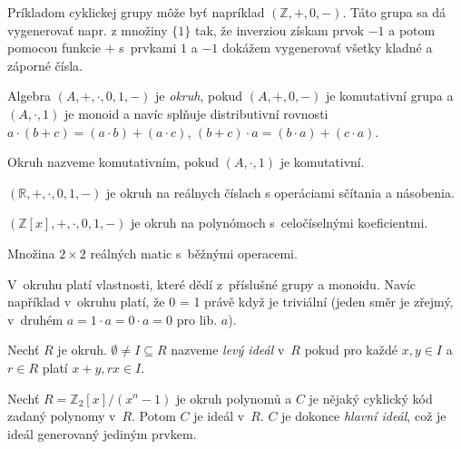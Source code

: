 \begin{example}
	Príkladom cyklickej grupy môže byť napríklad $(\mathbb{Z}, +, 0, -)$.
	Táto grupa sa dá vygenerovať napr. z množiny $\{1\}$ tak, že
	inverziou získam prvok $-1$ a potom pomocou funkcie $+$
	s~prvkami $1$ a $-1$ dokážem vygenerovať všetky kladné
	a záporné čísla.
\end{example}


\begin{definition}[Okruh]
    Algebra $(A, +, \cdot, 0, 1, -)$ je {\em okruh}, pokud
    $(A, +, 0, -)$ je komutativní grupa
    a $(A, \cdot, 1)$ je monoid
    a navíc splňuje distributivní rovnosti
    $a \cdot (b + c) = (a \cdot b) + (a \cdot c)$,
    $(b + c) \cdot a = (b \cdot a) + (c \cdot a)$.

    Okruh nazveme komutativním, pokud $(A, \cdot, 1)$ je komutativní.
\end{definition}

\begin{example}
    $(\mathbb{R}, +, \cdot, 0, 1, -)$ je okruh na reálnych 
	číslach s operáciami sčítania a násobenia.
\end{example}

\begin{example}
	$(\mathbb{Z}[x], +, \cdot, 0, 1, -)$ je okruh na polynómoch
	s~celočíselnými koeficientmi.
\end{example}

\begin{example}
    Množina $2 \times 2$ reálných matic s~běžnými operacemi.
\end{example}

V~okruhu platí vlastnosti, které dědí z~příslušné grupy a monoidu.
Navíc například v~okruhu platí, že 0 = 1 právě když je triviální (jeden
směr je zřejmý, v~druhém $a = 1 \cdot a = 0 \cdot a = 0$ pro lib. $a$).

\begin{definition}
    Nechť $R$ je okruh.
    $\emptyset \neq I \subseteq R$ nazveme {\em levý ideál} v~$R$
    pokud pro každé $x,y \in I$ a $r \in R$ platí
    $x + y, rx \in I$.
\end{definition}

\begin{example}
    Nechť $R = \mathbb{Z}_2[x] / (x^n - 1)$ je okruh polynomů
    a $C$ je nějaký cyklický kód zadaný polynomy v~$R$.
    Potom $C$ je ideál v~$R$.
    $C$ je dokonce {\em hlavní ideál}, což je ideál generovaný jediným prvkem.
\end{example}

